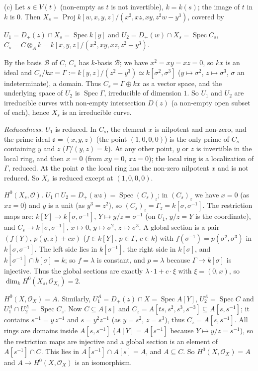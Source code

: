 \documentclass[11pt]{article}
\begin{document}
(c) Let $s\in V(t)$ (non-empty as $t$ is not invertible), $k=k(s)$; the image of $t$ in $k$ is $0$. Then $X_s=\operatorname{Proj}k[w,x,y,z]/(x^2,xz,xy,z^2w-y^3)$, covered by

$U_1=D_+(z)\cap X_s=\operatorname{Spec}k[y]$ and $U_2=D_+(w)\cap X_s=\operatorname{Spec}C_s$, $C_s=C\otimes_Ak=k[x,y,z]/(x^2,xy,xz,z^2-y^3)$.

By the basis $\mathcal B$ of $C$, $C_s$ has $k$-basis $\mathcal B$; we have $x^2=xy=xz=0$, so $kx$ is an ideal and $C_s/kx=\Gamma:=k[y,z]/(z^2-y^3)\simeq k[\sigma^2,\sigma^3]$ ($y\mapsto\sigma^2$, $z\mapsto\sigma^3$, $\sigma$ an indeterminate), a domain. Thus $C_s=\Gamma\oplus kx$ as a vector space, and the underlying space of $U_2$ is $\operatorname{Spec}\Gamma$, irreducible of dimension $1$. So $U_1$ and $U_2$ are irreducible curves with non-empty intersection $D(z)$ (a non-empty open subset of each), hence $X_s$ is an irreducible curve.

\emph{Reducedness.} $U_1$ is reduced. In $C_s$, the element $x$ is nilpotent and non-zero, and the prime ideal $\mathfrak o=(x,y,z)$ (the point $(1,0,0,0)$) is the only prime of $C_s$ containing $y$ and $z$ ($\Gamma/(y,z)=k$). At any other point, $y$ or $z$ is invertible in the local ring, and then $x=0$ (from $xy=0$, $xz=0$); the local ring is a localization of $\Gamma$, reduced. At the point $\mathfrak o$ the local ring has the non-zero nilpotent $x$ and is not reduced. So $X_s$ is reduced except at $(1,0,0,0)$.

\emph{$H^0(X_s,\mathcal O)$.} $U_1\cap U_2=D_+(wz)=\operatorname{Spec}(C_s)_z$; in $(C_s)_z$ we have $x=0$ (as $xz=0$) and $y$ is a unit (as $y^3=z^2$), so $(C_s)_z=\Gamma_z=k[\sigma,\sigma^{-1}]$. The restriction maps are: $k[Y]\to k[\sigma,\sigma^{-1}]$, $Y\mapsto y/z=\sigma^{-1}$ (on $U_1$, $y/z=Y$ is the coordinate), and $C_s\to k[\sigma,\sigma^{-1}]$, $x\mapsto0$, $y\mapsto\sigma^2$, $z\mapsto\sigma^3$. A global section is a pair $(f(Y),\,p(y,z)+cx)$ ($f\in k[Y]$, $p\in\Gamma$, $c\in k$) with $f(\sigma^{-1})=p(\sigma^2,\sigma^3)$ in $k[\sigma,\sigma^{-1}]$. The left side lies in $k[\sigma^{-1}]$, the right side in $k[\sigma]$, and $k[\sigma^{-1}]\cap k[\sigma]=k$; so $f=\lambda$ is constant, and $p=\lambda$ because $\Gamma\to k[\sigma]$ is injective. Thus the global sections are exactly $\lambda\cdot1+c\cdot\xi$ with $\xi=(0,x)$, so $\dim_kH^0(X_s,\mathcal O_{X_s})=2$.

\emph{$H^0(X,\mathcal O_X)=A$.} Similarly, $U_1^A=D_+(z)\cap X=\operatorname{Spec}A[Y]$, $U_2^A=\operatorname{Spec}C$ and $U_1^A\cap U_2^A=\operatorname{Spec}C_z$. Now $C\subseteq A[s]$ and $C_z=A[ts,s^2,s^3,s^{-3}]\subseteq A[s,s^{-1}]$; it contains $s^{-1}=y\,z^{-1}$ and $s=y^2z^{-1}$ (as $y=s^2$, $z=s^3$), thus $C_z=A[s,s^{-1}]$. All rings are domains inside $A[s,s^{-1}]$ ($A[Y]=A[s^{-1}]$ because $Y\mapsto y/z=s^{-1}$), so the restriction maps are injective and a global section is an element of $A[s^{-1}]\cap C$. This lies in $A[s^{-1}]\cap A[s]=A$, and $A\subseteq C$. So $H^0(X,\mathcal O_X)=A$ and $A\to H^0(X,\mathcal O_X)$ is an isomorphism.
\end{document}

